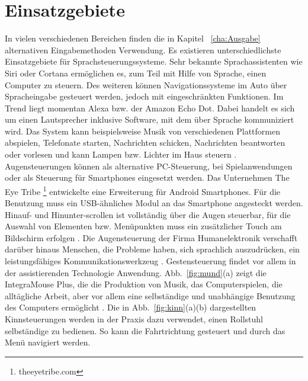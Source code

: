 \section{Einsatzgebiete}
%
In vielen verschiedenen Bereichen finden die in Kapitel ~\ref{cha:Ausgabe} alternativen Eingabemethoden Verwendung.
\newline \newline
Es existieren  unterschiedlichste Einsatzgebiete für Sprachsteuerungssysteme. Sehr bekannte Sprachassistenten wie \zB Siri oder Cortana ermöglichen es, zum Teil mit Hilfe von Sprache, einen Computer zu steuern. Des weiteren können Navigationssysteme im Auto über Spracheingabe gesteuert werden, jedoch mit eingeschränkten Funktionen. Im Trend liegt momentan Alexa bzw. der Amazon Echo Dot. Dabei handelt es sich um einen Lautsprecher inklusive Software, mit dem über Sprache kommuniziert wird. Das System kann beispielsweise Musik von verschiedenen Plattformen abspielen, Telefonate starten, Nachrichten schicken, Nachrichten beantworten oder vorlesen und kann Lampen bzw. Lichter im Haus steuern \cite{Alexa}. 
\newline \newline \newline \newline
Augensteuerungen können als alternative PC-Steuerung, bei Spielanwendungen oder als Steuerung für Smartphones eingesetzt werden. Das Unternehmen The Eye Tribe%
\footnote{theeyetribe.com}
%
entwickelte eine Erweiterung für Android Smartphones. Für die Benutzung muss ein USB-ähnliches Modul an das Smartphone angesteckt werden. Hinauf- und Hinunter-\linebreak scrollen ist vollständig über die Augen steuerbar, für die Auswahl von Elementen bzw. Menüpunkten muss ein zusätzlicher Touch am Bildschirm erfolgen \cite{eyeTribe}. Die Augensteuerung der Firma Humanelektronik verschafft darüber hinaus Menschen, die Probleme haben, sich sprachlich auszudrücken, ein leistungsfähiges Kommunikationswerkzeug \cite{SEETECH}.
\newline \newline
Gestensteuerung findet vor allem in der assistierenden Technologie Anwendung. Abb.~\ref{fig:mund}(a) zeigt die IntegraMouse Plus, die die Produktion von Musik, das Computerspielen, die alltägliche Arbeit, aber vor allem eine selbständige und unabhängige Benutzung des Computers ermöglicht \cite{INTEGRA_Stories}. Die in Abb.~\ref{fig:kinn}(a)(b) dargestellten Kinnsteuerungen werden in der Praxis dazu verwendet, einen Rollstuhl selbständige zu bedienen. So kann die Fahrtrichtung gesteuert und durch das Menü navigiert werden.
